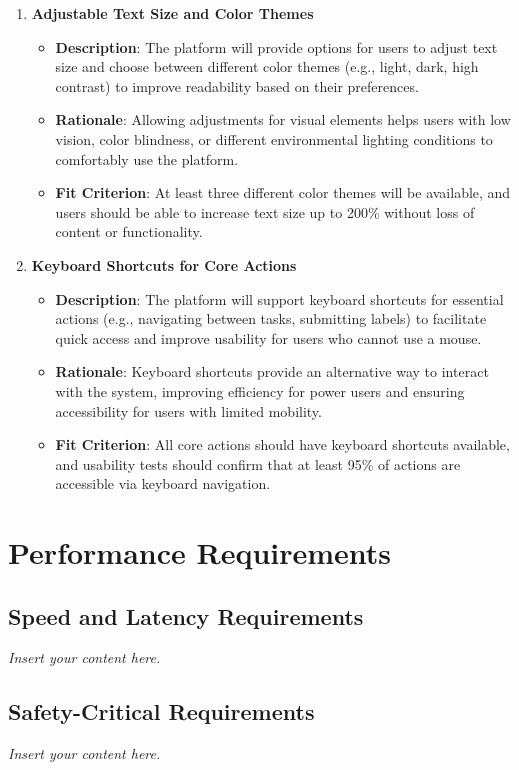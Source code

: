 \documentclass[12pt]{article}
\newcommand{\lips}{\textit{Insert your content here.}}
\begin{document}
\begin{enumerate}
    \item \textbf{Adjustable Text Size and Color Themes}  
        \begin{itemize}[leftmargin=2cm]
            \item \textbf{Description}: The platform will provide options for users to adjust text size and choose between different color themes (e.g., light, dark, high contrast) to improve readability based on their preferences.  
            \item \textbf{Rationale}: Allowing adjustments for visual elements helps users with low vision, color blindness, or different environmental lighting conditions to comfortably use the platform.  
            \item \textbf{Fit Criterion}: At least three different color themes will be available, and users should be able to increase text size up to 200\% without loss of content or functionality.
        \end{itemize}
    \item \textbf{Keyboard Shortcuts for Core Actions}  
        \begin{itemize}[leftmargin=2cm]
            \item \textbf{Description}: The platform will support keyboard shortcuts for essential actions (e.g., navigating between tasks, submitting labels) to facilitate quick access and improve usability for users who cannot use a mouse.  
            \item \textbf{Rationale}: Keyboard shortcuts provide an alternative way to interact with the system, improving efficiency for power users and ensuring accessibility for users with limited mobility.  
            \item \textbf{Fit Criterion}: All core actions should have keyboard shortcuts available, and usability tests should confirm that at least 95\% of actions are accessible via keyboard navigation.
        \end{itemize}
\end{enumerate}


\section{Performance Requirements}
\subsection{Speed and Latency Requirements}
\lips
\subsection{Safety-Critical Requirements}
\lips
\end{document}
